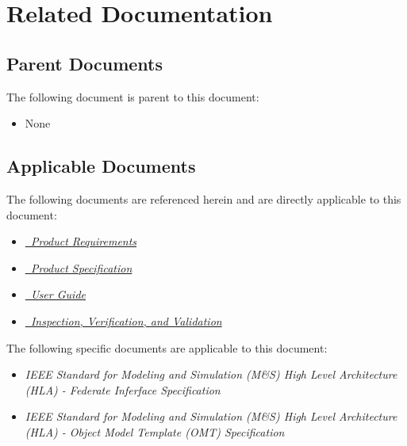 \documentclass[twoside,11pt,titlepage]{report}
\begin{document}
\chapter{Related Documentation}

\section{Parent Documents}

The following document is parent to this document:
\begin{itemize}
\item{None}
\end{itemize}

\section{Applicable Documents}
The following documents are referenced herein and are directly
applicable to this document:

\begin{itemize}
\item{\href{file:TrickHLAReqt.pdf}
           {\em \TrickHLA\ Product Requirements}}
\cite{trickhlaenv:TrickHLAReqt}

\item{\href{file:TrickHLASpec.pdf}
           {\em \TrickHLA\ Product Specification}}
\cite{trickhlaenv:TrickHLASpec}

\item{\href{file:TrickHLAUser.pdf}
           {\em \TrickHLA\ User Guide}}
\cite{trickhlaenv:TrickHLAUser}

\item{\href{file:TrickHLAIVV.pdf}
           {\em \TrickHLA\ Inspection, Verification, and Validation}}
\cite{trickhlaenv:TrickHLAIVV}

\end{itemize}

The following specific documents are applicable to this document:

\begin{itemize}
\item{\em IEEE Standard for Modeling and Simulation (M\&S) High Level
          Architecture (HLA) - Federate Inferface Specification}
\cite{IEEE1516:API}

\item{\em IEEE Standard for Modeling and Simulation (M\&S) High Level
              Architecture (HLA) - Object Model Template (OMT) Specification}
\cite{IEEE1516:OMT}

\end{itemize}
\end{document}
